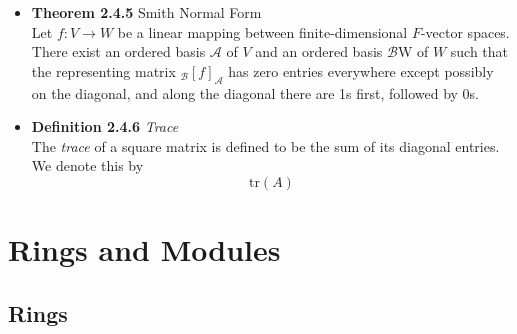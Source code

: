 \documentclass[11pt,a4paper]{article}
\begin{document}
\begin{itemize}
    \item \textbf{Theorem 2.4.5} Smith Normal Form \\
        Let $f : V \to W$ be a linear mapping between finite-dimensional $F$-vector spaces.
        There exist an ordered basis $\mathcal{A}$ of $V$ and an ordered basis
        $\mathcal{B}$W of $W$
        such that the representing matrix $_\mathcal{B}{[f]}_\mathcal{A}$
        has zero entries everywhere except possibly on the diagonal,
        and along the diagonal there are 1s first, followed by 0s.

    \item \textbf{Definition 2.4.6} \emph{Trace} \\
        The \emph{trace} of a square matrix is defined to be the sum of its diagonal entries.
        We denote this by
        \[
            \mathrm{tr}(A)
        \]
\end{itemize}

\section{Rings and Modules}

\subsection{Rings}
\end{document}
